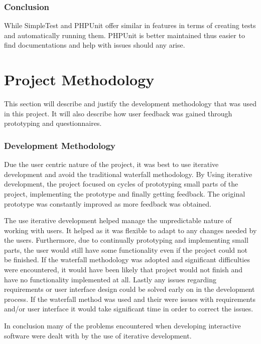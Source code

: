 \documentclass[a4paper,oneside,11pt]{report}
\begin{document}
\subsection{Conclusion}
While SimpleTest and PHPUnit offer similar in features in terms of creating tests and automatically running them. PHPUnit is better maintained thus easier to find documentations and help with issues should any arise. 


\chapter{Project Methodology}
This section will describe and justify the development methodology that was used in this project. It will also describe how user feedback was gained through prototyping and questionnaires.

\subsection{Development Methodology} 
Due the user centric nature of the project, it was best to use iterative development and avoid the traditional waterfall methodology. By Using iterative development, the project focused on cycles of prototyping small parts of the project, implementing the prototype and finally getting feedback. The original prototype was constantly improved as more feedback was obtained.

The use iterative development helped manage the unpredictable nature of working with users. It helped as it was flexible to adapt to any changes needed by the users. Furthermore, due to continually prototyping and implementing small parts, the user would still have some functionality even if the project could not be finished. If the waterfall methodology was adopted and significant difficulties were encountered, it would have been likely that project would not finish and have no functionality implemented at all. 
Lastly any issues regarding requirements or user interface design could be solved early on in the development process. If the waterfall method was used  and their were issues with requirements and/or user interface it would take significant time in order to correct the issues.

In conclusion many of the problems  encountered when developing interactive software were dealt with by the use of iterative development. 
\pagebreak
\end{document}
